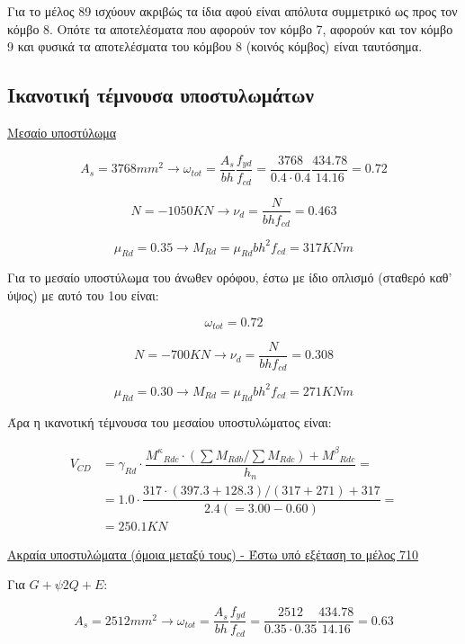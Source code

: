 \noindent
Για το μέλος 89 ισχύουν ακριβώς τα ίδια αφού είναι απόλυτα συμμετρικό ως προς τον κόμβο 8. Οπότε τα αποτελέσματα που αφορούν τον κόμβο 7, αφορούν και τον κόμβο 9 και φυσικά τα αποτελέσματα του κόμβου 8 (κοινός κόμβος) είναι ταυτόσημα.

\subsection{Ικανοτική τέμνουσα υποστυλωμάτων}

\noindent
\underline{Μεσαίο υποστύλωμα}

\bigskip

\[
A_s = 3768 mm^2 \rightarrow \omega_{tot} = \dfrac{A_s}{bh}\dfrac{f_{yd}}{f_{cd}} = \dfrac{3768}{0.4\cdot0.4}\dfrac{434.78}{14.16} = 0.72
\]

\[
N = -1050 KN \rightarrow \nu_d = \dfrac{N}{bhf_{cd}} = 0.463
\]

\[
\mu_{Rd} = 0.35 \rightarrow M_{Rd} = \mu_{Rd}bh^2 f_{cd} = 317KNm
\]

\noindent
Για το μεσαίο υποστύλωμα του άνωθεν ορόφου, έστω με ίδιο οπλισμό (σταθερό καθ' ύψος) με αυτό του 1ου είναι:

\[
\omega_{tot} =  0.72
\]

\[
N = -700 KN \rightarrow \nu_d = \dfrac{N}{bhf_{cd}} = 0.308
\]

\[
\mu_{Rd} = 0.30 \rightarrow M_{Rd} = \mu_{Rd}bh^2 f_{cd} = 271KNm
\]

\noindent
Άρα η ικανοτική τέμνουσα του μεσαίου υποστυλώματος είναι:

\bigskip

\begin{align*}
V_{CD} &= \gamma_{Rd}\cdot\dfrac{{M^{\kappa}}_{Rdc}\cdot\left(\sum M_{Rdb}/\sum M_{Rdc}\right)+{M^{\beta}}_{Rdc}}{h_n} = \\[15pt]
&= 1.0\cdot\dfrac{317\cdot(397.3+128.3)/(317+271) + 317}{2.4(=3.00 - 0.60)} = \\[15pt]
&=250.1 KN
\end{align*}

\bigskip

\noindent
\underline{Ακραία υποστυλώματα (όμοια μεταξύ τους) - Έστω υπό εξέταση το μέλος 710}

\bigskip

\noindent
Για $G+\psi2Q+E$:

\[
A_s = 2512 mm^2 \rightarrow \omega_{tot} = \dfrac{A_s}{bh}\dfrac{f_{yd}}{f_{cd}} = \dfrac{2512}{0.35\cdot0.35}\dfrac{434.78}{14.16} = 0.63
\]

